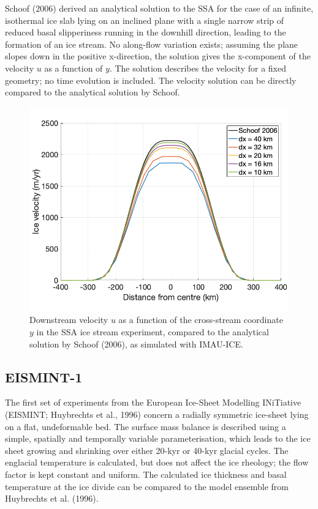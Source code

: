 \documentclass{article}
\begin{document}
Schoof (2006) derived an analytical solution to the SSA for the case of an infinite, isothermal ice slab lying on an inclined plane with a single narrow strip of reduced basal slipperiness running in the downhill direction, leading to the formation of an ice stream. No along-flow variation exists; assuming the plane slopes down in the positive x-direction, the solution gives the x-component of the velocity $u$ as a function of $y$. The solution describes the velocity for a fixed geometry; no time evolution is included. The velocity solution can be directly compared to the analytical solution by Schoof.

\begin{figure}[H]
  \includegraphics[width=0.5\linewidth]{Fig_benchmark_SSA_icestream.png}
  \caption{Downstream velocity $u$ as a function of the cross-stream coordinate $y$ in the SSA ice stream experiment, compared to the analytical solution by Schoof (2006), as simulated with IMAU-ICE.}
\end{figure}

\subsection{EISMINT-1}

The first set of experiments from the European Ice-Sheet Modelling INiTiative (EISMINT; Huybrechts et al., 1996) concern a radially symmetric ice-sheet lying on a flat, undeformable bed. The surface mass balance is described using a simple, spatially and temporally variable parameterisation, which leads to the ice sheet growing and shrinking over either 20-kyr or 40-kyr glacial cycles. The englacial temperature is calculated, but does not affect the ice rheology; the flow factor is kept constant and uniform. The calculated ice thickness and basal temperature at the ice divide can be compared to the model ensemble from Huybrechts et al. (1996).
\end{document}
